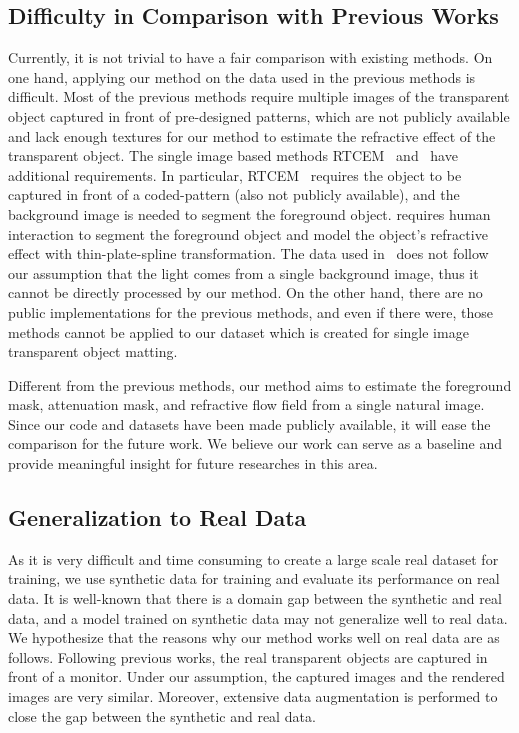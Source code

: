 \subsection{Difficulty in Comparison with Previous Works}
Currently, it is not trivial to have a fair comparison with existing methods. On one hand, applying our method on the data used in the previous methods is difficult. Most of the previous methods require multiple images of the transparent object captured in front of pre-designed patterns, which are not publicly available and lack enough textures for our method to estimate the refractive effect of the transparent object. 
The single image based methods RTCEM~\cite{chuang2000environment} and~\cite{yeung2011matting} have additional requirements. In particular, RTCEM~\cite{chuang2000environment} requires the object to be captured in front of a coded-pattern (also not publicly available), and the background image is needed to segment the foreground object. 
\cite{yeung2011matting} requires human interaction to segment the foreground object and model the object's refractive effect with thin-plate-spline transformation. The data used in~\cite{yeung2011matting} does not follow our assumption that the light comes from a single background image, thus it cannot be directly processed by our method.
On the other hand, there are no public implementations for the previous methods, and even if there were, those methods cannot be applied to our dataset which is created for single image transparent object matting.

Different from the previous methods, our method aims to estimate the foreground mask, attenuation mask, and refractive flow field from a single natural image. Since our code and datasets have been made publicly available, it will ease the comparison for the future work. We believe our work can serve as a baseline and provide meaningful insight for future researches in this area.

\subsection{Generalization to Real Data}
    As it is very difficult and time consuming to create a large scale real dataset for training, we use synthetic data for training and evaluate its performance on real data. 
It is well-known that there is a domain gap between the synthetic and real data, and a model trained on synthetic data may not generalize well to real data.
We hypothesize that the reasons why our method works well on real data are as follows.
Following previous works, the real transparent objects are captured in front of a monitor.
Under our assumption, the captured images and the rendered images are very similar. Moreover, extensive data augmentation is performed to close the gap between the synthetic and real data.


